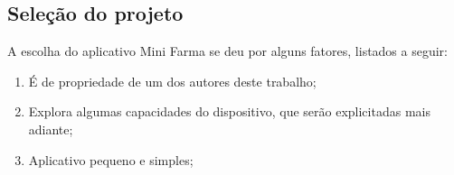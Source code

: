 \begin{comment}
Porque Ionic? Porque não, outro? Quais os criterios usados para escolher o Ionic?
Ionic é open source, gratuito, muito focado em performance e possui html e css otimizados para dispositivos móveis.
\end{comment}

\subsection{Seleção do projeto} \label{subsec:selecaodoprojeto}

A escolha do aplicativo Mini Farma se deu por alguns fatores, listados a seguir:

\begin{enumerate}
    \item É de propriedade de um dos autores deste trabalho;
    \item Explora algumas capacidades do dispositivo, que serão explicitadas mais adiante;
    \item Aplicativo pequeno e simples;
\end{enumerate}
 